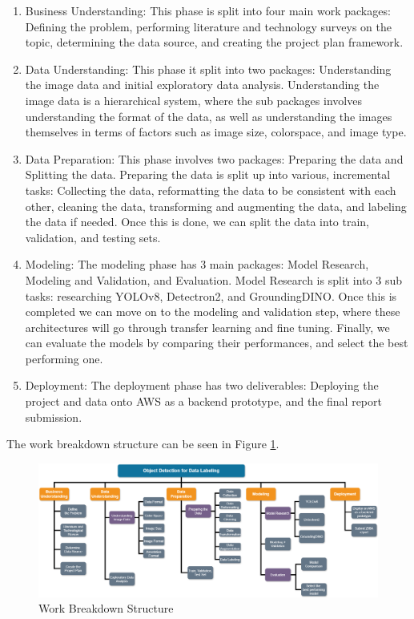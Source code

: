 \documentclass[stu,12pt,floatsintext]{apa7}
\begin{document}
\begin{enumerate}
	\item Business Understanding: This phase is split into four main work packages: Defining the problem, performing literature and technology surveys on the topic, determining the data source, and creating the project plan framework.

	\item Data Understanding: This phase it split into two packages: Understanding the image data and initial exploratory data analysis. Understanding the image data is a hierarchical system, where the sub packages involves understanding the format of the data, as well as understanding the images themselves in terms of factors such as image size, colorspace, and image type.

	\item Data Preparation: This phase involves two packages: Preparing the data and Splitting the data. Preparing the data is split up into various, incremental tasks: Collecting the data, reformatting the data to be consistent with each other, cleaning the data, transforming and augmenting the data, and labeling the data if needed. Once this is done, we can split the data into train, validation, and testing sets.

	\item Modeling: The modeling phase has 3 main packages: Model Research, Modeling and Validation, and Evaluation. Model Research is split into 3 sub tasks: researching YOLOv8, Detectron2, and GroundingDINO. Once this is completed we can move on to the modeling and validation step, where these architectures will go through transfer learning and fine tuning. Finally, we can evaluate the models by comparing their performances, and select the best performing one.

	\item Deployment: The deployment phase has two deliverables: Deploying the project and data onto AWS as a backend prototype, and the final report submission.
\end{enumerate}

The work breakdown structure can be seen in Figure \ref{fig:wbs}.
\begin{figure}[!htb]
	\centering
	\includegraphics[width=1\linewidth]{./images/WBS_updated.png}
	\caption{Work Breakdown Structure}
	\label{fig:wbs}
\end{figure}
\end{document}

